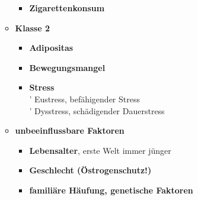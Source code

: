 \begin{itemize}
\begin{itemize}
\begin{itemize}
							\item \textbf{Zigarettenkonsum}
						\end{itemize}
					\item \textbf{Klasse 2}
						\begin{itemize}
							\item \textbf{Adipositas}
							\item \textbf{Bewegungsmangel}
							\item \textbf{Stress}\\
								' Eustress, befähigender Stress\\
								' Dysstress, schädigender Dauerstress
						\end{itemize}
					\item \textbf{unbeeinflussbare Faktoren}
						\begin{itemize}
							\item \textbf{Lebensalter}, erste Welt immer jünger
							\item \textbf{Geschlecht (Östrogenschutz!)}
							\item \textbf{familiäre Häufung, genetische Faktoren}
						\end{itemize}
				\end{itemize}
			\end{itemize}
